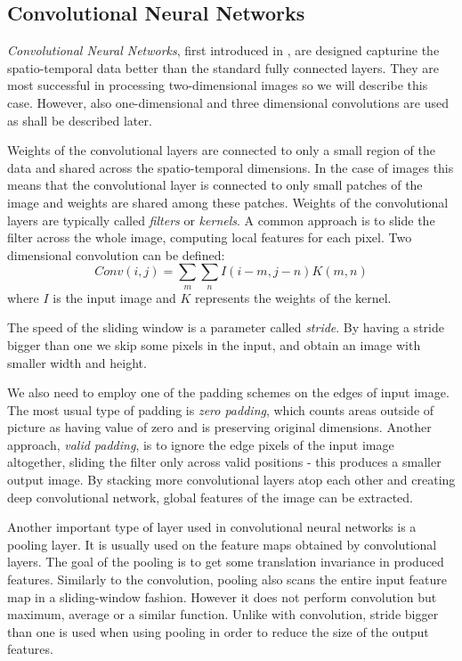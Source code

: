 

\subsection{Convolutional Neural Networks}
\textit{Convolutional Neural Networks}, first introduced in \cite{lecun_backpropagation_1989}, are designed capturine the spatio-temporal data better than the standard fully connected layers. They are most successful in processing two-dimensional images so we will describe this case. However, also one-dimensional and three dimensional convolutions are used as shall be described later.  \par
Weights of the convolutional layers are connected to only a small region of the data and shared across the spatio-temporal dimensions. In the case of images this means that the convolutional layer is connected to only small patches of the image and weights are shared among these patches. Weights of the convolutional layers are typically called \textit{filters} or \textit{kernels}. A common approach is to slide the filter across the whole image,  computing local features for each pixel.
Two dimensional convolution can be defined:
$$Conv(i,j) = \sum_m {\sum_n {I(i-m,j-n)K(m,n)}}$$ where $I$ is the input image and $K$ represents the weights of the kernel.\par
The speed of the sliding window is a parameter called \textit{stride}. By having a stride bigger than one we skip some pixels in the input, and obtain an image with smaller width and height.\par 
We also need to employ one of the padding schemes on the edges of input image. The most usual type of padding is \textit{zero padding}, which counts areas outside of picture as having value of zero and is preserving original dimensions. Another approach, \textit{valid padding}, is to ignore the edge pixels of the input image altogether, sliding the filter only across valid positions - this produces a smaller output image.
By stacking more convolutional layers atop each other and creating deep convolutional network,  global features of the image can be extracted. 
\par
Another important type of layer used in convolutional neural networks is a pooling layer. It is usually used on the feature maps obtained by convolutional layers. The goal of the pooling is to get some translation invariance in produced features. Similarly to the convolution, pooling also scans the entire input feature map in a sliding-window fashion. However it does not perform convolution but maximum, average or a similar function. Unlike with convolution, stride bigger than one is used when using pooling in order to reduce the size of the output features.
